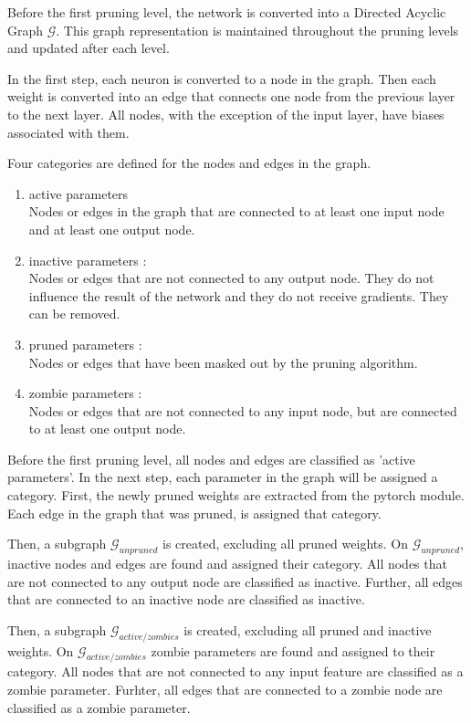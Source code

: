 Before the first pruning level, the network is converted into a Directed Acyclic Graph $\mathcal{G}$.
This graph representation is maintained throughout the pruning levels and updated after each level.

In the first step, each neuron is converted to a node in the graph.
Then each weight is converted into an edge that connects one node from the previous layer to the next layer.
All nodes, with the exception of the input layer, have biases associated with them.

Four categories are defined for the nodes and edges in the graph.
\begin{enumerate}
    \item active parameters  \\
    Nodes or edges in the graph that are connected to at least one input node and at least one output node.
    \item inactive parameters : \\
    Nodes or edges that are not connected to any output node. They do not influence the result of the network and they do not receive gradients. They can be removed.
    \item pruned parameters : \\
    Nodes or edges that have been masked out by the pruning algorithm.
    \item zombie parameters : \\
    Nodes or edges that are not connected to any input node, but are connected to at least one output node.
\end{enumerate}
Before the first pruning level, all nodes and edges are classified as 'active parameters'.
In the next step, each parameter in the graph will be assigned a category.
First, the newly pruned weights are extracted from the pytorch module.
Each edge in the graph that was pruned, is assigned that category.

Then, a subgraph $\mathcal{G}_{unpruned}$ is created, excluding all pruned weights.
On $\mathcal{G}_{unpruned}$, inactive nodes and edges are found and assigned their category.
All nodes that are not connected to any output node are classified as inactive.
Further, all edges that are connected to an inactive node are classified as inactive.

Then, a subgraph $\mathcal{G}_{active/zombies}$ is created, excluding all pruned and inactive weights.
On $\mathcal{G}_{active/zombies}$ zombie parameters are found and assigned to their category. 
All nodes that are not connected to any input feature are classified as a zombie parameter. 
Furhter, all edges that are connected to a zombie node are classified as a zombie parameter.

